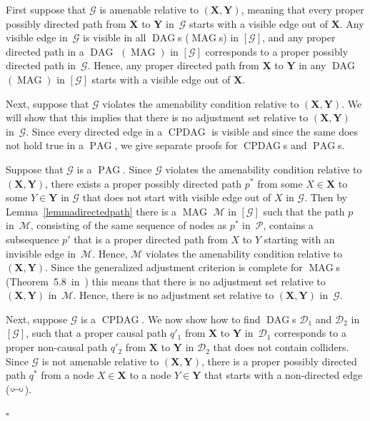 \documentclass[11pt,a4paper]{article}
\newenvironment{proofof}[1][]{\begin{trivlist}
   \item[\hskip \labelsep {\bfseries Proof of #1.}]}{\hfill{}$\square$\end{trivlist}}
\DeclareMathOperator{\CPDAG}{CPDAG}
\DeclareMathOperator{\DAG}{DAG}
\DeclareMathOperator{\MAG}{MAG}
\DeclareMathOperator{\PAG}{PAG}
\newcommand{\amen}{the amenability condition\xspace}
\newcommand{\g}[1][G]{\mathcal{#1}}
\newcommand{\pstar}[1][p]{{#1}^{*}}
\newcommand{\circcirc}{
  \setlength{\unitlength}{1mm}
  \begin{picture}(5,1)(0,0)
    \put(1,1){\circle{1}}
    \put(1.5,1){\line(1,0){2}}
    \put(4,1){\circle{1}}
  \end{picture}
}
\begin{document}
\begin{proofof}[Lemma~\ref{lemma:adj amen gen}]
   First suppose that $\g$ is amenable relative to $(\mathbf{X},\mathbf{Y})$, meaning that every proper possibly directed path from $\mathbf{X}$ to $\mathbf{Y}$ in~$\g$ starts with a visible edge out of $\mathbf{X}$. Any visible edge in~$\g$ is visible in all $\DAG$s ($\MAG$s) in $[\g]$, and any proper directed path in a $\DAG$ $(\MAG)$ in $[\g]$ corresponds to a proper possibly directed path in~$\g$. Hence, any proper directed path from $\mathbf{X}$ to $\mathbf{Y}$ in any $\DAG$ $(\MAG)$ in $[\g]$ starts with a visible edge out of $\mathbf{X}$.

   Next, suppose that $\g$ violates \amen{} relative to $(\mathbf{X},\mathbf{Y})$. We will show that this implies that there is no adjustment set relative to $(\mathbf{X},\mathbf{Y})$ in~$\g$. Since every directed edge in a $\CPDAG$ is visible and since the same does not hold true in a $\PAG$, we give separate proofs for $\CPDAG$s and $\PAG$s.

Suppose that $\g$ is a $\PAG$. Since $\g$ violates \amen{} relative to $(\mathbf{X,Y})$, there exists a proper possibly directed path $\pstar$ from some $X \in \mathbf{X}$ to some $Y \in \mathbf{Y}$ in $\g$ that does not start with visible edge out of $X$ in $\g$. Then by Lemma~\ref{lemmadirectedpath} there is a $\MAG$ $\g[M]$ in $[\g]$ such that the path $p$ in~$\g[M]$, consisting of the same sequence of nodes as $\pstar$ in~$\g[P]$, contains a subsequence $p'$ that is a proper directed path from $X$ to $Y$ starting with an invisible edge in~$\g[M]$. Hence, $\g[M]$ violates \amen{} relative to $(\mathbf{X,Y})$. Since the generalized adjustment criterion is complete for $\MAG$s (Theorem~5.8~in~\citealp{vanconstructing}) this means that there is no adjustment set relative to $(\mathbf{X},\mathbf{Y})$ in~$\g[M]$. Hence, there is no adjustment set relative to $(\mathbf{X},\mathbf{Y})$ in~$\g$.

Next, suppose $\g$ is a $\CPDAG$. We now show how to find $\DAG$s $\g[D]_1$ and $\g[D]_2$ in $[\g]$, such that a proper causal path $q'_1$ from $\mathbf{X}$ to $\mathbf{Y}$ in~$\g[D]_1$ corresponds to a proper non-causal path $q'_2$ from $\mathbf{X}$ to $\mathbf{Y}$ in  $\g[D]_2$ that does not contain colliders.
 Since $\g$ is not amenable relative to $(\mathbf{X,Y})$, there is a proper possibly directed path $\pstar[q]$ from a node $X \in \mathbf{X}$ to a node $Y \in \mathbf{Y}$ that starts with a non-directed edge ($\circcirc$).


\end{proofof}
\end{document}
